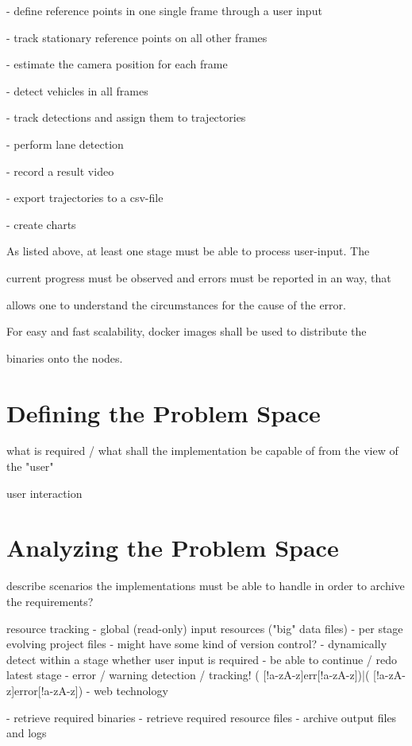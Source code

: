 - define reference points in one single frame through a user input

- track stationary reference points on all other frames

- estimate the camera position for each frame

- detect vehicles in all frames

- track detections and assign them to trajectories

- perform lane detection

- record a result video

- export trajectories to a csv-file

- create charts



As listed above, at least one stage must be able to process user-input. The

current progress must be observed and errors must be reported in an way, that

allows one to understand the circumstances for the cause of the error.

For easy and fast scalability, docker images shall be used to distribute the

binaries onto the nodes.


\section{Defining the Problem Space}

what is required / what shall the implementation be capable of from the view of the "user"

user interaction



\section{Analyzing the Problem Space}

describe scenarios the implementations must be able to handle in order to archive the requirements?

resource tracking
- global (read-only) input resources ("big" data files)
- per stage evolving project files
- might have some kind of version control?
- dynamically detect within a stage whether user input is required
- be able to continue / redo latest stage
- error / warning detection / tracking!
( [!a-zA-z]err[!a-zA-z])|( [!a-zA-z]error[!a-zA-z])
- web technology

- retrieve required binaries
- retrieve required resource files
- archive output files and logs


